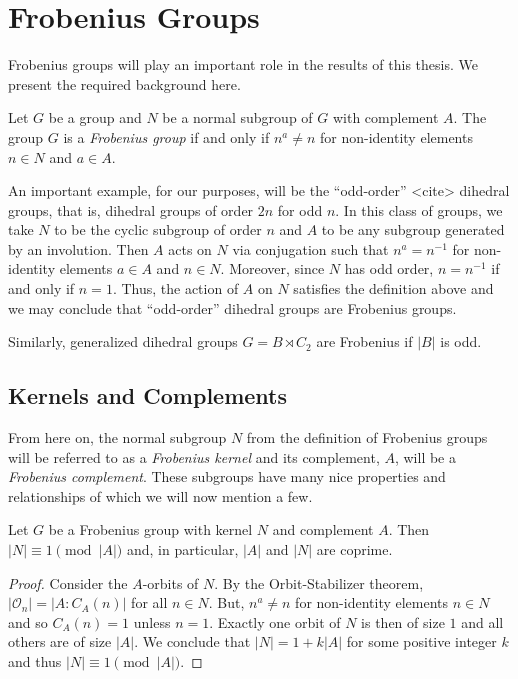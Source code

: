\documentclass[main.tex]{subfiles}
\begin{document}
\section{Frobenius Groups}

Frobenius groups will play an important role in the results of this thesis. We present the required background here.

\hss

\begin{definition}
Let $G$ be a group and $N$ be a normal subgroup of $G$ with complement $A$. The group $G$ is a \emph{Frobenius group} if and only if $n^a \ne n$ for non-identity elements $n \in N$ and $a \in A$.
\end{definition}

\hss

An important example, for our purposes, will be the ``odd-order'' <cite> dihedral groups, that is, dihedral groups of order $2n$ for odd $n$. In this class of groups, we take $N$ to be the cyclic subgroup of order $n$ and $A$ to be any subgroup generated by an involution. Then $A$ acts on $N$ via conjugation such that $n^a = n^{-1}$ for non-identity elements $a \in A$ and $n \in N$. Moreover, since $N$ has odd order, $n = n^{-1}$ if and only if $n = 1$. Thus, the action of $A$ on $N$ satisfies the definition above and we may conclude that ``odd-order'' dihedral groups are Frobenius groups.

Similarly, generalized dihedral groups $G = B \rtimes C_2$ are Frobenius if $|B|$ is odd.

\hss

\subsection{Kernels and Complements}

\hss

From here on, the normal subgroup $N$ from the definition of Frobenius groups will be referred to as a \emph{Frobenius kernel} and its complement, $A$, will be a \emph{Frobenius complement}. These subgroups have many nice properties and relationships of which we will now mention a few.

\begin{lemma}\label{frobeniuscoprime}
Let $G$ be a Frobenius group with kernel $N$ and complement $A$. Then $|N| \equiv 1 \pmod{|A|}$ and, in particular, $|A|$ and $|N|$ are coprime.
\end{lemma}

\begin{proof}
Consider the $A$-orbits of $N$. By the Orbit-Stabilizer theorem, $|\mathcal{O}_n| = |A : C_A(n)|$ for all $n \in N$. But, $n^a \ne n$ for non-identity elements $n \in N$ and so $C_A(n) = 1$ unless $n = 1$. Exactly one orbit of $N$ is then of size $1$ and all others are of size $|A|$. We conclude that $|N| = 1 + k |A|$ for some positive integer $k$ and thus $|N| \equiv 1 \pmod{|A|}$.
\end{proof}
\end{document}
